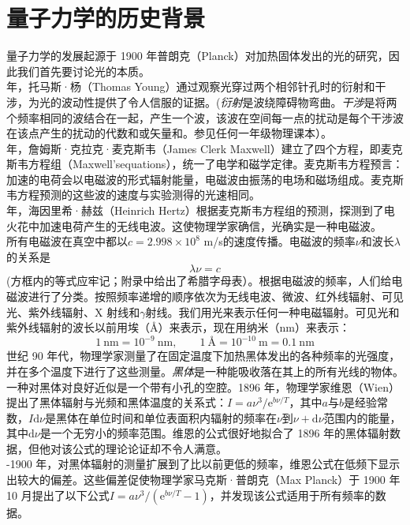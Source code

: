 \documentclass{book}
\begin{document}
	\section{量子力学的历史背景}
	\noindent 量子力学的发展起源于 1900 年普朗克（Planck）对加热固体发出的光的研究，因此我们首先要讨论光的本质。\\
	 年，托马斯·杨（Thomas Young）通过观察光穿过两个相邻针孔时的衍射和干涉，为光的波动性提供了令人信服的证据。(\textit{衍射}是波绕障碍物弯曲。\textit{干涉}是将两个频率相同的波结合在一起，产生一个波，该波在空间每一点的扰动是每个干涉波在该点产生的扰动的代数和或矢量和。参见任何一年级物理课本）。\\
	 年，詹姆斯·克拉克·麦克斯韦（James Clerk Maxwell）建立了四个方程，即麦克斯韦方程组（Maxwell'sequations），统一了电学和磁学定律。麦克斯韦方程预言：加速的电荷会以电磁波的形式辐射能量，电磁波由振荡的电场和磁场组成。麦克斯韦方程预测的这些波的速度与实验测得的光速相同。\\
	 年，海因里希·赫兹（Heinrich Hertz）根据麦克斯韦方程组的预测，探测到了电火花中加速电荷产生的无线电波。这使物理学家确信，光确实是一种电磁波。\\
	\indent 所有电磁波在真空中都以$c = 2.998 \times 10^8$ m/s的速度传播。电磁波的频率$\nu$和波长$\lambda$的关系是
	\begin{equation}
		\boxed{\lambda \nu = c}
	\end{equation}
	(方框内的等式应牢记；附录中给出了希腊字母表）。根据电磁波的频率，人们给电磁波进行了分类。按照频率递增的顺序依次为无线电波、微波、红外线辐射、可见光、紫外线辐射、X 射线和$\gamma$射线。我们用光来表示任何一种电磁辐射。可见光和紫外线辐射的波长以前用埃（\AA）来表示，现在用纳米（nm）来表示：
	\begin{equation}
		\boxed{1 \: \text{nm} = 10^{-9} \: \text{nm}, \qquad 1 \: \text{\AA}= 10^{-10} \: \text{m} = 0.1 \: \text{nm}}
	\end{equation}
	 世纪 90 年代，物理学家测量了在固定温度下加热黑体发出的各种频率的光强度，并在多个温度下进行了这些测量。\textit{黑体}是一种能吸收落在其上的所有光线的物体。一种对黑体对良好近似是一个带有小孔的空腔。1896 年，物理学家维恩（Wien）提出了黑体辐射与光频和黑体温度的关系式：$I=a\nu^3/\text{e}^{b\nu /T}$，其中$a$与$b$是经验常数，$I \text{d} \nu$是黑体在单位时间和单位表面积内辐射的频率在$\nu$到$\nu + \text{d} \nu$范围内的能量，其中$\text{d} \nu$是一个无穷小的频率范围。维恩的公式很好地拟合了 1896 年的黑体辐射数据，但他对该公式的理论论证却不令人满意。\\
	-1900 年，对黑体辐射的测量扩展到了比以前更低的频率，维恩公式在低频下显示出较大的偏差。这些偏差促使物理学家马克斯·普朗克（Max Planck）于 1900 年 10 月提出了以下公式$I=a \nu^3 / \left(\text{e}^{b\nu / T}-1\right)$，并发现该公式适用于所有频率的数据。\\
\end{document}

